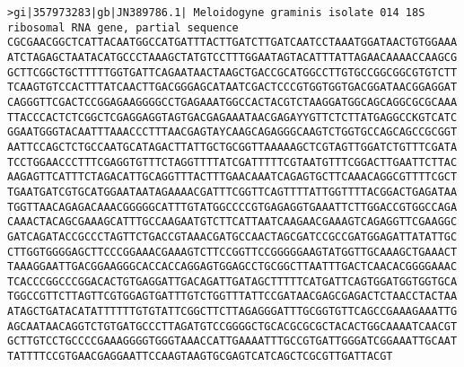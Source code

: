 \documentclass[11pt]{article}
\begin{document}
\begin{Verbatim}[commandchars=\\\{\}]
>gi|357973283|gb|JN389786.1| Meloidogyne graminis isolate 014 18S ribosomal RNA gene, partial sequence
CGCGAACGGCTCATTACAATGGCCATGATTTACTTGATCTTGATCAATCCTAAATGGATAACTGTGGAAA
ATCTAGAGCTAATACATGCCCTAAAGCTATGTCCTTTGGAATAGTACATTTATTAGAACAAAACCAAGCG
GCTTCGGCTGCTTTTTGGTGATTCAGAATAACTAAGCTGACCGCATGGCCTTGTGCCGGCGGCGTGTCTT
TCAAGTGTCCACTTTATCAACTTGACGGGAGCATAATCGACTCCCGTGGTGGTGACGGATAACGGAGGAT
CAGGGTTCGACTCCGGAGAAGGGGCCTGAGAAATGGCCACTACGTCTAAGGATGGCAGCAGGCGCGCAAA
TTACCCACTCTCGGCTCGAGGAGGTAGTGACGAGAAATAACGAGAYYGTTCTCTTATGAGGCCKGTCATC
GGAATGGGTACAATTTAAACCCTTTAACGAGTAYCAAGCAGAGGGCAAGTCTGGTGCCAGCAGCCGCGGT
AATTCCAGCTCTGCCAATGCATAGACTTATTGCTGCGGTTAAAAAGCTCGTAGTTGGATCTGTTTCGATA
TCCTGGAACCCTTTCGAGGTGTTTCTAGGTTTTATCGATTTTTCGTAATGTTTCGGACTTGAATTCTTAC
AAGAGTTCATTTCTAGACATTGCAGGTTTACTTTGAACAAATCAGAGTGCTTCAAACAGGCGTTTTCGCT
TGAATGATCGTGCATGGAATAATAGAAAACGATTTCGGTTCAGTTTTATTGGTTTTACGGACTGAGATAA
TGGTTAACAGAGACAAACGGGGGCATTTGTATGGCCCCGTGAGAGGTGAAATTCTTGGACCGTGGCCAGA
CAAACTACAGCGAAAGCATTTGCCAAGAATGTCTTCATTAATCAAGAACGAAAGTCAGAGGTTCGAAGGC
GATCAGATACCGCCCTAGTTCTGACCGTAAACGATGCCAACTAGCGATCCGCCGATGGAGATTATATTGC
CTTGGTGGGGAGCTTCCCGGAAACGAAAGTCTTCCGGTTCCGGGGGAAGTATGGTTGCAAAGCTGAAACT
TAAAGGAATTGACGGAAGGGCACCACCAGGAGTGGAGCCTGCGGCTTAATTTGACTCAACACGGGGAAAC
TCACCCGGCCCGGACACTGTGAGGATTGACAGATTGATAGCTTTTTCATGATTCAGTGGATGGTGGTGCA
TGGCCGTTCTTAGTTCGTGGAGTGATTTGTCTGGTTTATTCCGATAACGAGCGAGACTCTAACCTACTAA
ATAGCTGATACATATTTTTTGTGTATTCGGCTTCTTAGAGGGATTTGCGGTGTTCAGCCGAAAGAAATTG
AGCAATAACAGGTCTGTGATGCCCTTAGATGTCCGGGGCTGCACGCGCGCTACACTGGCAAAATCAACGT
GCTTGTCCTGCCCCGAAAGGGGTGGGTAAACCATTGAAAATTTGCCGTGATTGGGATCGGAAATTGCAAT
TATTTTCCGTGAACGAGGAATTCCAAGTAAGTGCGAGTCATCAGCTCGCGTTGATTACGT


\end{Verbatim}
\end{document}
